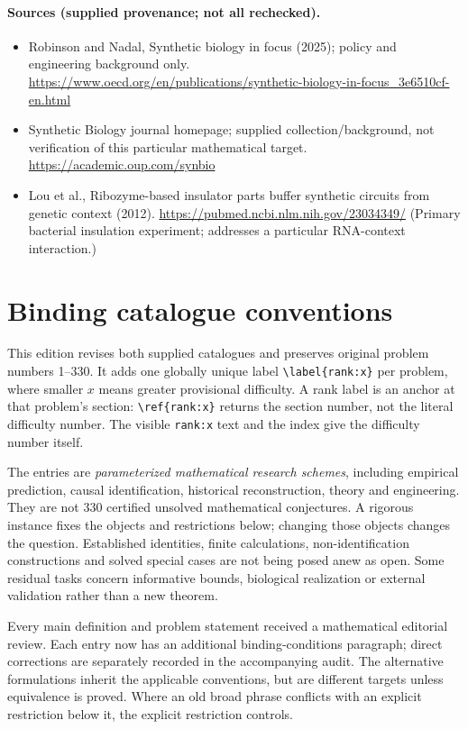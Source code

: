 \documentclass[11pt]{article}
\begin{document}
\paragraph{Sources (supplied provenance; not all rechecked).} \begin{itemize}
\item Robinson and Nadal, Synthetic biology in focus (2025); policy and engineering background only. \url{https://www.oecd.org/en/publications/synthetic-biology-in-focus_3e6510cf-en.html}
\item Synthetic Biology journal homepage; supplied collection/background, not verification of this particular mathematical target. \url{https://academic.oup.com/synbio}
\item Lou et al., Ribozyme-based insulator parts buffer synthetic circuits from genetic context (2012). \url{https://pubmed.ncbi.nlm.nih.gov/23034349/} (Primary bacterial insulation experiment; addresses a particular RNA-context interaction.)
\end{itemize}


\section*{Binding catalogue conventions}
This edition revises both supplied catalogues and preserves original problem numbers 1--330. It adds one globally unique label \verb|\label{rank:x}| per problem, where smaller $x$ means greater provisional difficulty. A rank label is an anchor at that problem's section: \verb|\ref{rank:x}| returns the section number, not the literal difficulty number. The visible \texttt{rank:x} text and the index give the difficulty number itself.

The entries are \emph{parameterized mathematical research schemes}, including empirical prediction, causal identification, historical reconstruction, theory and engineering. They are not 330 certified unsolved mathematical conjectures. A rigorous instance fixes the objects and restrictions below; changing those objects changes the question. Established identities, finite calculations, non-identification constructions and solved special cases are not being posed anew as open. Some residual tasks concern informative bounds, biological realization or external validation rather than a new theorem.

Every main definition and problem statement received a mathematical editorial review. Each entry now has an additional binding-conditions paragraph; direct corrections are separately recorded in the accompanying audit. The alternative formulations inherit the applicable conventions, but are different targets unless equivalence is proved. Where an old broad phrase conflicts with an explicit restriction below it, the explicit restriction controls.
\end{document}
